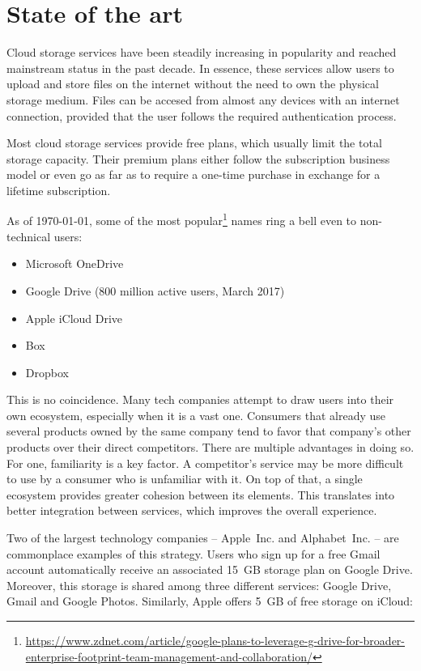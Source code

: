 \chapter{State of the art}

Cloud storage services have been steadily increasing in popularity and reached mainstream status in the past decade. In essence, these services allow users to upload and store files on the internet without the need to own the physical storage medium. Files can be accesed from almost any devices with an internet connection, provided that the user follows the required authentication process.

Most cloud storage services provide free plans, which usually limit the total storage capacity. Their premium plans either follow the subscription business model or even go as far as to require a one-time purchase in exchange for a lifetime subscription.

As of \monthyeardate\today, some of the most popular\footnote{\url{https://www.zdnet.com/article/google-plans-to-leverage-g-drive-for-broader-enterprise-footprint-team-management-and-collaboration/}} names ring a bell even to non-technical users:
\begin{itemize}
\item Microsoft OneDrive
\item Google Drive (800 million active users, March 2017)
\item Apple iCloud Drive
\item Box
\item Dropbox
\end{itemize}

This is no coincidence. Many tech companies attempt to draw users into their own ecosystem, especially when it is a vast one. Consumers that already use several products owned by the same company tend to favor that company's other products over their direct competitors. There are multiple advantages in doing so. For one, familiarity is a key factor. A competitor's service may be more difficult to use by a consumer who is unfamiliar with it. On top of that, a single ecosystem provides greater cohesion between its elements. This translates into better integration between services, which improves the overall experience.

Two of the largest technology companies -- \mbox{Apple Inc.} and \mbox{Alphabet Inc.} -- are commonplace examples of this strategy. Users who sign up for a free Gmail account automatically receive an associated \mbox{15 GB} storage plan on Google Drive. Moreover, this storage is shared among three different services: Google Drive, Gmail and Google Photos. Similarly, Apple offers \mbox{5 GB} of free storage on iCloud:

